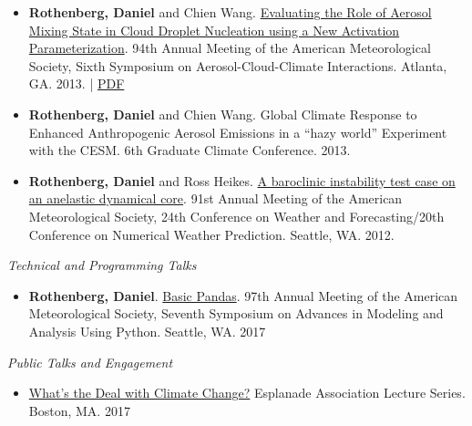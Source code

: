 \documentclass[11pt,letterpaper]{article}
\begin{document}
\begin{itemize}[itemindent=-10pt]
 \item \textbf{Rothenberg, Daniel} and Chien Wang. \href{https://ams.confex.com/ams/94Annual/webprogram/Paper240205.html}{Evaluating the Role of Aerosol Mixing State in Cloud Droplet Nucleation using a New Activation Parameterization}. 94th Annual Meeting of the American Meteorological Society, Sixth Symposium on Aerosol-Cloud-Climate Interactions. Atlanta, GA. 2013. | \href{https://figshare.com/articles/AMS_2014_Evaluating_the_Role_of_Aerosol_Mixing_State_in_Cloud_Droplet_Nucleation_towards_Developing_a_New_Activation_Parameterization/918655}{PDF}

 \item \textbf{Rothenberg, Daniel} and Chien Wang. Global Climate Response to Enhanced Anthropogenic Aerosol Emissions in a ``hazy world'' Experiment with the CESM. 6th Graduate Climate Conference. 2013.

 \item \textbf{Rothenberg, Daniel} and Ross Heikes. \href{https://ams.confex.com/ams/91Annual/webprogram/Paper180796.html}{A baroclinic instability test case on an anelastic dynamical core}. 91st Annual Meeting of the American Meteorological Society, 24th Conference on Weather and Forecasting/20th Conference on Numerical Weather Prediction. Seattle, WA. 2012.
\end{itemize}


\bigskip
\emph{Technical and Programming Talks}
\medskip
\begin{itemize}[itemindent=-10pt]

 \item \textbf{Rothenberg, Daniel}. \href{https://github.com/darothen/python_for_climate_data_science/blob/master/basic_pandas.ipynb}{Basic Pandas}. 97th Annual Meeting of the American Meteorological Society, Seventh Symposium on Advances in Modeling and Analysis Using Python. Seattle, WA. 2017

\end{itemize}


\bigskip
\emph{Public Talks and Engagement}
\medskip
\begin{itemize}[itemindent=-10pt]

 \item  \href{https://docs.google.com/presentation/d/158WNGamjcRgUr1TvOVVixOQXRt1uc2kUyYe5a6D9ICA/edit?usp=drive_web}{What's the Deal with Climate Change?} Esplanade Association Lecture Series. Boston, MA. 2017

\end{itemize}
\end{document}
